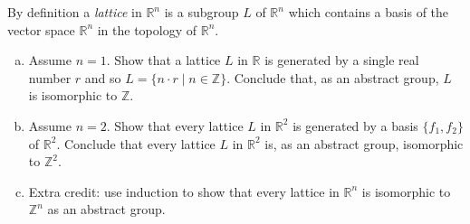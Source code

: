 \documentclass{article}
\newcounter{Problem}
\newenvironment{Problem}{\begin{Exercise}[name={Problem},
                                          counter={Problem}]}
                        {\end{Exercise}}
\begin{document}
\pagebreak

\begin{Problem}
By definition a \emph{lattice} in $\mathbb{R}^n$ is a subgroup $L$ of
$\mathbb{R}^n$ which contains a basis of the vector space
$\mathbb{R}^n$ in the topology of $\mathbb{R}^n$.
\begin{enumerate}[(a)]
  \item{
    Assume $n = 1$. Show that a lattice $L$ in $\mathbb{R}$ is
    generated by a single real number $r$ and so
    $L = \{ n \cdot r \mid n \in \mathbb{Z} \}$. Conclude that, as an
    abstract group, $L$ is isomorphic to $\mathbb{Z}$.
  }
  \item{
    Assume $n = 2$. Show that every lattice $L$ in $\mathbb{R}^2$ is
    generated by a basis $\{f_1, f_2\}$ of $\mathbb{R}^2$. Conclude
    that every lattice $L$ in $\mathbb{R}^2$ is, as an abstract group,
    isomorphic to $\mathbb{Z}^2$.
  }
  \item{
    Extra credit: use induction to show that every lattice in
    $\mathbb{R}^n$ is isomorphic to $\mathbb{Z}^n$ as an abstract group.
  }
\end{enumerate}
\end{Problem}
\end{document}

